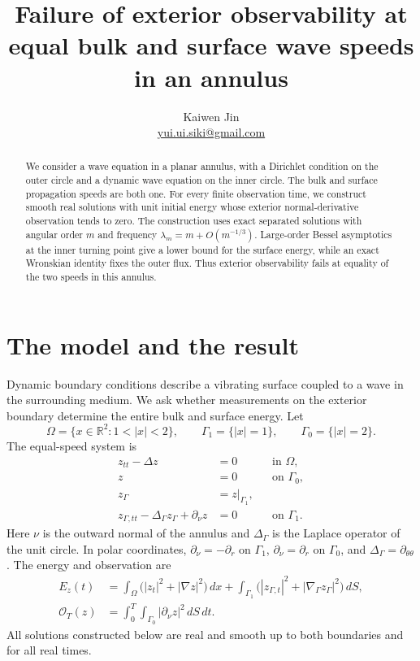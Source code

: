 \documentclass[11pt]{article}
\title{Failure of exterior observability at equal bulk and surface wave speeds in an annulus}
\author{Kaiwen Jin\\\small\href{mailto:yui.ui.siki@gmail.com}{yui.ui.siki@gmail.com}}
\date{}
\begin{document}
\maketitle

\begin{abstract}
We consider a wave equation in a planar annulus, with a Dirichlet condition on
the outer circle and a dynamic wave equation on the inner circle. The bulk and
surface propagation speeds are both one. For every finite observation time,
we construct smooth real solutions with unit initial energy whose exterior
normal-derivative observation tends to zero. The construction uses exact
separated solutions with angular order \(m\) and frequency
\(\lambda_m=m+O(m^{-1/3})\). Large-order Bessel asymptotics at the inner turning
point give a lower bound for the surface energy, while an exact Wronskian
identity fixes the outer flux. Thus exterior observability fails at equality
of the two speeds in this annulus.
\end{abstract}

\section{The model and the result}

Dynamic boundary conditions describe a vibrating surface coupled to a wave
in the surrounding medium. We ask whether measurements on the exterior
boundary determine the entire bulk and surface energy. Let
\[
\Omega=\{x\in\mathbb R^2:1<|x|<2\},\qquad
\Gamma_1=\{|x|=1\},\qquad \Gamma_0=\{|x|=2\}.
\]
The equal-speed system is
\begin{equation}\label{eq:model}
\begin{aligned}
z_{tt}-\Delta z&=0&&\text{in }\Omega,\\
z&=0&&\text{on }\Gamma_0,\\
z_\Gamma&=z|_{\Gamma_1},\\
z_{\Gamma,tt}-\Delta_\Gamma z_\Gamma+\partial_\nu z&=0
&&\text{on }\Gamma_1 .
\end{aligned}
\end{equation}
Here \(\nu\) is the outward normal of the annulus and \(\Delta_\Gamma\)
is the Laplace operator of the unit circle. In polar coordinates,
\(\partial_\nu=-\partial_r\) on \(\Gamma_1\),
\(\partial_\nu=\partial_r\) on \(\Gamma_0\), and
\(\Delta_\Gamma=\partial_{\theta\theta}\). The energy and observation are
\begin{align}
E_z(t)&=\int_\Omega\bigl(|z_t|^2+|\nabla z|^2\bigr)\,dx
+\int_{\Gamma_1}\bigl(|z_{\Gamma,t}|^2+
|\nabla_\Gamma z_\Gamma|^2\bigr)\,dS,\label{eq:energy}\\
\mathcal O_T(z)&=\int_0^T\int_{\Gamma_0}|\partial_\nu z|^2\,dS\,dt.
\label{eq:observation}
\end{align}
All solutions constructed below are real and smooth up to both boundaries
and for all real times.
\end{document}
